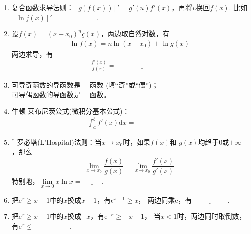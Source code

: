 \documentclass{article}
\newif\ifte
\newcommand{\e}{\mathrm{e}}
\renewcommand{\d}{\mathrm{d}}
\renewcommand\leq\leqslant
\renewcommand\geq\geqslant
\begin{document}
\begin{multicols}{2}
\begin{enumerate}[leftmargin=20pt]
\item 复合函数求导法则：$ [g(f(x))]'=g'(u)f'(x) $，再将$ u $换回$ f(x) $. 
比如$ [\ln f(x)]'=\underline{\ \ifte \dfrac{f'(x)}{f(x)}
\else \hspace{2cm} \fi\ } $.

\item 设$ f(x)=(x-x_0)^ng(x) $，两边取自然对数，有
\begin{gather*}
    \ln f(x) =n\ln(x-x_0)+\ln g(x)
\end{gather*}
两边求导，有
\begin{align*}
    \frac{f'(x)}{f(x)} =\underline{\ \ifte 
    \frac{n}{x-x_0}+\frac{g'(x)}{g(x)}\else \hspace{3cm} \fi\ }
\end{align*}

\item 可导奇函数的导函数是\underline{\ \ifte 偶\else \hspace{0.5cm} \fi\ }函数
\ifte \else (填“奇”或“偶”)\fi；\\
可导偶函数的导函数是\underline{\ \ifte 奇\else \hspace{0.5cm} \fi\ }函数。

\item 牛顿-莱布尼茨公式(微积分基本公式)：
\begin{gather*}
    \int_a^bf'(x)\d x=\underline{\ \ifte 
        f(b)-f(a)\else \hspace{2cm} \fi\ }
\end{gather*}

\item $^*$ 罗必塔(L'Hospital)法则：当$ x\to x_0 $时，如果$ f(x) $和
$ g(x) $均趋于0或$ \pm \infty $，那么
\begin{gather*}
    \lim\limits_{x\to x_0}\dfrac{f(x)}{g(x)}=
    \lim\limits_{x\to x_0}\dfrac{f'(x)}{g'(x)}
\end{gather*}
特别地，$ \lim\limits_{x\to 0} x\ln x=\underline{\ 
    \ifte 0\else \hspace{1cm} \fi\ } $.

\item 把$ \e^x\geq x+1 $中的$ x $换成$ x-1 $，有$ \e^{x-1}\geq x $，
两边同乘$ \e $，有$ \underline{\ \ifte \e^x\geq \e x
    \else \hspace{2cm} \fi\ } $.

\item 把$ \e^x\geq x+1 $中的$ x $换成$ -x $，有$ \e^{-x}\geq -x+1 $，
当$ x<1 $时，两边同时取倒数，有$ \e^x\leq \underline{\ \ifte 
\dfrac{1}{1-x}  \else \hspace{2cm} \fi\ } $.


\end{enumerate}
\end{multicols}
\end{document}
